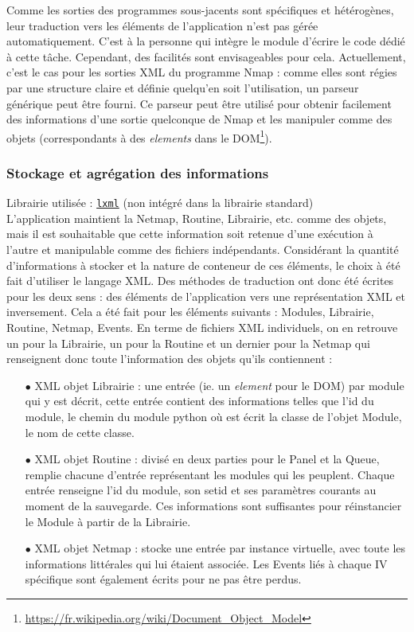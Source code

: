 \documentclass[]{article}
\begin{document}
Comme les sorties des programmes sous-jacents sont spécifiques et hétérogènes, leur traduction vers les éléments de l'application n'est pas gérée automatiquement. C'est à la personne qui intègre le module d'écrire le code dédié à cette tâche. Cependant, des facilités sont envisageables pour cela. Actuellement, c'est le cas pour les sorties XML du programme Nmap : comme elles sont régies par une structure claire et définie quelqu'en soit l'utilisation, un parseur générique peut être fourni. Ce parseur peut être utilisé pour obtenir facilement des informations d'une sortie quelconque de Nmap et les manipuler comme des objets (correspondants à des \textit{elements} dans le DOM\footnote{\url{https://fr.wikipedia.org/wiki/Document_Object_Model}}).

\subsubsection{Stockage et agrégation des informations}
\label{appcfg}
\noindent Librairie utilisée : \href{https://lxml.de}{\texttt{lxml}} (non intégré dans la librairie standard)\\

L'application maintient la Netmap, Routine, Librairie, etc. comme des objets, mais il est souhaitable que cette information soit retenue d'une exécution à l'autre et manipulable comme des fichiers indépendants. Considérant la quantité d'informations à stocker et la nature de conteneur de ces éléments, le choix à été fait d'utiliser le langage XML. Des méthodes de traduction ont donc été écrites pour les deux sens : des éléments de l'application vers une représentation XML et inversement. Cela a été fait pour les éléments suivants : Modules, Librairie, Routine, Netmap, Events. En terme de fichiers XML individuels, on en retrouve un pour la Librairie, un pour la Routine et un dernier pour la Netmap qui renseignent donc toute l'information des objets qu'ils contiennent :\\

\begin{itemize}
\item[$\bullet$] XML objet Librairie : une entrée (ie. un \textit{element} pour le DOM) par module qui y est décrit, cette entrée contient des informations telles que l'id du module, le chemin du module python où est écrit la classe de l'objet Module, le nom de cette classe.
\vspace{0.2cm}
\item[$\bullet$] XML objet Routine : divisé en deux parties pour le Panel et la Queue, remplie chacune d'entrée représentant les modules qui les peuplent. Chaque entrée renseigne l'id du module, son setid et ses paramètres courants au moment de la sauvegarde. Ces informations sont suffisantes pour réinstancier le Module à partir de la Librairie.\\

\item[$\bullet$] XML objet Netmap : stocke une entrée par instance virtuelle, avec toute les informations littérales qui lui étaient associée. Les Events liés à chaque IV spécifique sont également écrits pour ne pas être perdus. 
\end{itemize}
\vspace{0.2cm}
\end{document}
